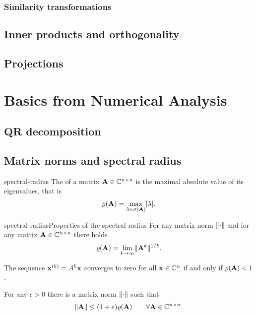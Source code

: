 \subsection{Similarity transformations}

\section{Inner products and orthogonality}

\section{Projections}


\chapter{Basics from Numerical Analysis}

\section{QR decomposition}


\section{Matrix norms and spectral radius}

\begin{Definition}{spectral-radius}
  The  of a matrix $\mathbf A\in\mathbb C^{n\times n}$ is the
  maximal absolute value of its eigenvalues, that is
  \begin{gather}
    \varrho(\mathbf A) = \max_{\lambda\in\sigma(\mathbf A)} \lvert\lambda\rvert.
  \end{gather}
\end{Definition}

\begin{Lemma*}{spectral-radius}{Properties of the spectral radius}
  For any matrix norm $\lVert\cdot\rVert$ and for any matrix $\mathbf A\in\mathbb C^{n\times n}$ there holds
  \begin{gather}
    \varrho(\mathbf A) = \lim_{k\to\infty} \lVert\mathbf A^k\rVert^{1/k}.
  \end{gather}

  The sequence $\mathbf x^{(k)} = A^k\mathbf x$ converges to zero for all
  $\mathbf x\in\mathbb C^n$ if and only if $\varrho(\mathbf A)<1$.

  For any $\epsilon>0$
  there is a matrix norm $\lVert\cdot\rVert$ such that
  \begin{gather}
    \lVert\mathbf A\rVert \le (1+\varepsilon) \varrho(\mathbf A) \qquad \forall \mathbf A\in\mathbb C^{n\times n}.
  \end{gather}
\end{Lemma*}

